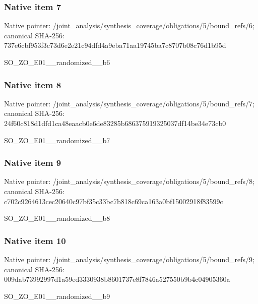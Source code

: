 \documentclass[10pt,a4paper]{article}
\begin{document}
\subsubsection{Native item 7}
Native pointer: /joint\_\allowbreak{}analysis/synthesis\_\allowbreak{}coverage/obligations/5/bound\_\allowbreak{}refs/6; canonical SHA-256: 737e6cbf953f3c73d6e2e21c94dfd4a9eba71aa19745ba7c8707b08c76d1b95d

\begingroup\raggedright\sloppy SO\_\allowbreak{}ZO\_\allowbreak{}E01\_\allowbreak{}\_\allowbreak{}randomized\_\allowbreak{}\_\allowbreak{}b6\par\endgroup

\subsubsection{Native item 8}
Native pointer: /joint\_\allowbreak{}analysis/synthesis\_\allowbreak{}coverage/obligations/5/bound\_\allowbreak{}refs/7; canonical SHA-256: 24f60c818d1dfd1ca48eaacb0e6de83285b686375919325037df14be34e73cb0

\begingroup\raggedright\sloppy SO\_\allowbreak{}ZO\_\allowbreak{}E01\_\allowbreak{}\_\allowbreak{}randomized\_\allowbreak{}\_\allowbreak{}b7\par\endgroup

\subsubsection{Native item 9}
Native pointer: /joint\_\allowbreak{}analysis/synthesis\_\allowbreak{}coverage/obligations/5/bound\_\allowbreak{}refs/8; canonical SHA-256: c702c9264613cec20640c97bf35c33bc7b818c69ca163a0bf15002918f83599c

\begingroup\raggedright\sloppy SO\_\allowbreak{}ZO\_\allowbreak{}E01\_\allowbreak{}\_\allowbreak{}randomized\_\allowbreak{}\_\allowbreak{}b8\par\endgroup

\subsubsection{Native item 10}
Native pointer: /joint\_\allowbreak{}analysis/synthesis\_\allowbreak{}coverage/obligations/5/bound\_\allowbreak{}refs/9; canonical SHA-256: 009dab73992997d1a59ed3330938b8601737e8f7846a527550b9b4c04905360a

\begingroup\raggedright\sloppy SO\_\allowbreak{}ZO\_\allowbreak{}E01\_\allowbreak{}\_\allowbreak{}randomized\_\allowbreak{}\_\allowbreak{}b9\par\endgroup
\end{document}
